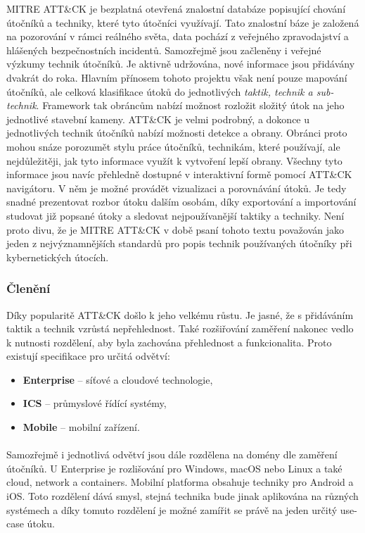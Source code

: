 MITRE ATT\&CK je bezplatná otevřená znalostní databáze popisující chování útočníků a techniky, které tyto útočníci využívají.
Tato znalostní báze je založená na pozorování v rámci reálného světa, data pochází z veřejného zpravodajství a hlášených bezpečnostních incidentů.
Samozřejmě jsou začleněny i veřejné výzkumy technik útočníků.
Je aktivně udržována, nové informace jsou přidávány dvakrát do roka\cite{mitre_attack_framework_faq}.
Hlavním přínosem tohoto projektu však není pouze mapování útočníků, ale celková klasifikace útoků do jednotlivých \textit{taktik, technik a sub-technik}.
Framework tak obráncům nabízí možnost rozložit složitý útok na jeho jednotlivé stavební kameny.
ATT\&CK je velmi podrobný, a dokonce u jednotlivých technik útočníků nabízí možnosti detekce a obrany.
Obránci proto mohou snáze porozumět stylu práce útočníků, technikám, které používají, ale nejdůležitěji, jak tyto informace využít k vytvoření lepší obrany.
Všechny tyto informace jsou navíc přehledně dostupné v interaktivní formě pomocí ATT\&CK navigátoru\cite{mitre_attack_navigator}.
V něm je možné provádět vizualizaci a porovnávání útoků.
Je tedy snadné prezentovat rozbor útoku dalším osobám, díky exportování a importování studovat již popsané útoky a sledovat nejpoužívanější taktiky a techniky.
Není proto divu, že je MITRE ATT\&CK v době psaní tohoto textu považován jako jeden z nejvýznamnějších standardů pro popis technik používaných útočníky při kybernetických útocích.\cite{mitre_attack_framework}


\subsubsection{Členění}
Díky popularitě ATT\&CK došlo k jeho velkému růstu.
Je jasné, že s přidáváním taktik a technik vzrůstá nepřehlednost.
Také rozšiřování zaměření nakonec vedlo k nutnosti rozdělení, aby byla zachována přehlednost a funkcionalita.
Proto existují specifikace pro určitá odvětví\cite{mitre_attack_navigator}:

\begin{itemize}
	\item \textbf{Enterprise} -- síťové a cloudové technologie,
	\item \textbf{ICS} -- průmyslové řídící systémy,
	\item \textbf{Mobile} -- mobilní zařízení.
\end{itemize}

\paragraph{}
Samozřejmě i jednotlivá odvětví jsou dále rozdělena na domény dle zaměření útočníků.
U Enterprise je rozlišování pro Windows, macOS nebo Linux a také cloud, network a containers.
Mobilní platforma obsahuje techniky pro Android a iOS\@.
Toto rozdělení dává smysl, stejná technika bude jinak aplikována na různých systémech a díky tomuto rozdělení je možné zamířit se právě na jeden určitý use-case útoku.

